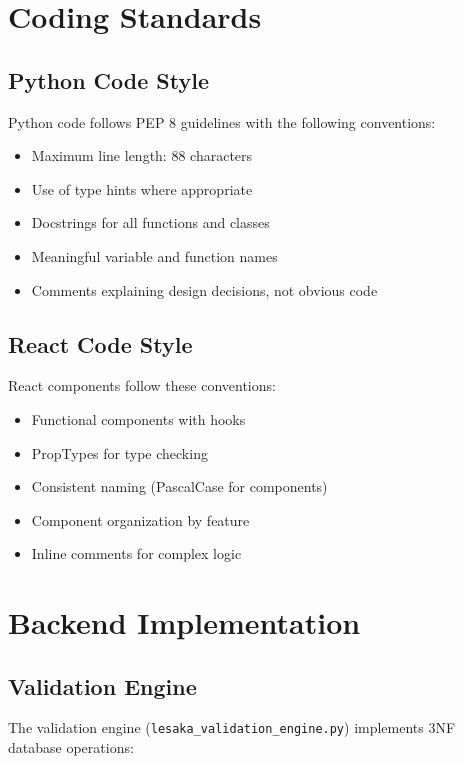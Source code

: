 \section{Coding Standards}

\subsection{Python Code Style}

Python code follows PEP 8 guidelines with the following conventions:

\begin{itemize}
    \item Maximum line length: 88 characters
    \item Use of type hints where appropriate
    \item Docstrings for all functions and classes
    \item Meaningful variable and function names
    \item Comments explaining design decisions, not obvious code
\end{itemize}

\subsection{React Code Style}

React components follow these conventions:

\begin{itemize}
    \item Functional components with hooks
    \item PropTypes for type checking
    \item Consistent naming (PascalCase for components)
    \item Component organization by feature
    \item Inline comments for complex logic
\end{itemize}

\section{Backend Implementation}

\subsection{Validation Engine}

The validation engine (\texttt{lesaka\_validation\_engine.py}) implements 3NF database operations:

